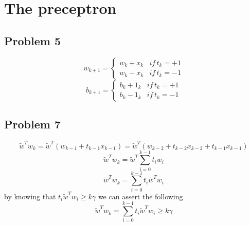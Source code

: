 \section{The preceptron}

\subsection*{Problem 5}

\[
w_{k+1}=\begin{cases}
w_{k}+x_{k} & if\, t_{k}=+1\\
w_{k}-x_{k} & if\, t_{k}=-1
\end{cases}
\]
\[
b_{k+1}=\begin{cases}
b_{k}+1_{k} & if\, t_{k}=+1\\
b_{k}-1_{k} & if\, t_{k}=-1
\end{cases}
\]


\subsection*{Problem 7}
\[
\tilde{w}^{T}w_{k}=\tilde{w}^{T}\left(w_{k-1}+t_{k-1}x_{k-1}\right)=\tilde{w}^{T}\left(w_{k-2}+t_{k-2}x_{k-2}+t_{k-1}x_{k-1}\right)
\]
\[
\tilde{w}^{T}w_{k}=\tilde{w}^{T}\sum_{i=0}^{k-1}t_{i}w_{i}
\]
\[
\tilde{w}^{T}w_{k}=\sum_{i=0}^{k-1}t_{i}\tilde{w}^{T}w_{i}
\]
by knowing that $t_{i}\tilde{w}^{T}w_{i}\geq k\gamma$ we can assert
the following
\[
\tilde{w}^{T}w_{k}=\sum_{i=0}^{k-1}t_{i}\tilde{w}^{T}w_{i}\geq k\gamma
\]

\newpage
